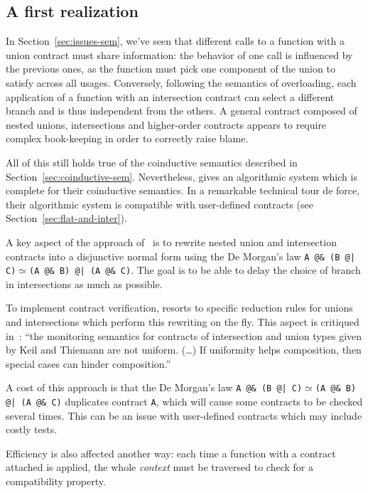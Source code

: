 \documentclass[sigplan,10pt,review,anonymous]{acmart}
\newcommand{\nickel}[1]{\lstinline[language=nickel]{#1}}
\begin{document}
\subsection{A first realization}
\label{sec:keil-thiemann}

In Section~\ref{sec:issues-sem}, we've seen that different calls to a function
with a union contract must share information: the behavior of one call is
influenced by the previous ones, as the function must pick one component of the
union to satisfy across all usages. Conversely, following the semantics of
overloading, each application of a function with an intersection contract can
select a different branch and is thus independent from the others. A general
contract composed of nested unions, intersections and higher-order contracts
appears to require complex book-keeping in order to correctly raise
blame.

All of this still holds true of the coinductive semantics described in
Section~\ref{sec:coinductive-sem}. Nevertheless,
\cite{KeilThiemannUnionIntersection} gives an algorithmic system which
is complete for their coinductive semantics. In a remarkable technical
tour de force, their algorithmic system is compatible with
user-defined contracts (see Section~\ref{sec:flat-and-inter}).

A key aspect of the approach of~\cite{KeilThiemannUnionIntersection}
is to rewrite nested union and intersection contracts into a
disjunctive normal form using the De Morgan's law \nickel{A @& (B @|
  C)}$\simeq$\nickel{(A @& B) @| (A @& C)}. The goal is to be able to
delay the choice of branch in intersections as much as possible.

To implement contract verification, \cite{KeilThiemannUnionIntersection} resorts to
specific reduction rules for unions and intersections which perform this
rewriting on the fly. This aspect is critiqued
in~\cite{RootCauseOfBlame}:
``the monitoring semantics for
contracts of intersection and union types given by Keil and Thiemann are not
uniform. (\ldots) If uniformity helps composition, then special cases can hinder
composition.''

A cost of this approach is that the De Morgan's law
\nickel{A @& (B @| C)}$\simeq$\nickel{(A @& B) @| (A @& C)} duplicates
contract \nickel{A}, which will cause some contracts to be checked
several times. This can be an issue with user-defined contracts which
may include costly tests.

Efficiency is also affected another way: each time a function with a
contract attached is applied, the whole \emph{context} must be
traversed to check for a compatibility property.
\end{document}

